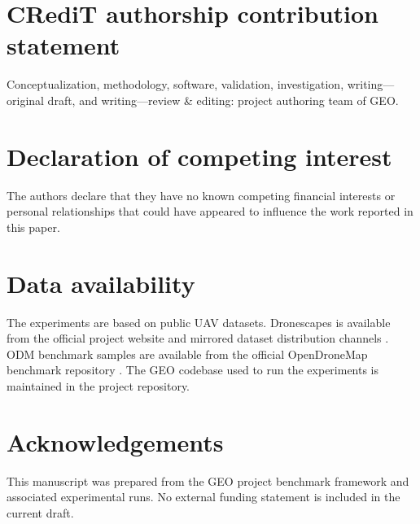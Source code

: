 \documentclass[preprint,12pt]{elsarticle}
\begin{document}
\section*{CRediT authorship contribution statement}
Conceptualization, methodology, software, validation, investigation, writing---original draft, and writing---review \& editing: project authoring team of GEO.

\section*{Declaration of competing interest}
The authors declare that they have no known competing financial interests or personal relationships that could have appeared to influence the work reported in this paper.

\section*{Data availability}
The experiments are based on public UAV datasets. Dronescapes is available from the official project website and mirrored dataset distribution channels \citep{DronescapesDataset}. ODM benchmark samples are available from the official OpenDroneMap benchmark repository \citep{ODMDataBenchmarks}. The GEO codebase used to run the experiments is maintained in the project repository.

\section*{Acknowledgements}
This manuscript was prepared from the GEO project benchmark framework and associated experimental runs. No external funding statement is included in the current draft.

\nocite{Zhao2014Direct,Zheng2018multi,Wu2018Integration,Zhang2020UAV,Yu2021Automatic,Xu2021Robust,Chen2024End,Tong2024Large,Wu2024evaluation,Shi2025Accurate}



\end{document}
